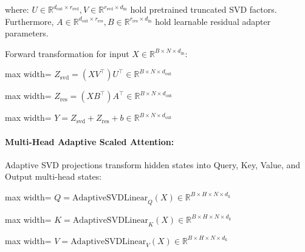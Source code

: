 where:
$U \in \mathbb{R}^{d_{\text{out}} \times r_{\text{svd}}}, V \in \mathbb{R}^{r_{\text{svd}} \times d_{\text{in}}}$ hold pretrained truncated SVD factors. Furthermore, $A \in \mathbb{R}^{d_{\text{out}} \times r_{\text{res}}}, B \in \mathbb{R}^{r_{\text{res}} \times d_{\text{in}}}$ hold learnable residual adapter parameters.


Forward transformation for input $X \in \mathbb{R}^{B \times N \times d_{\text{in}}}$:

\begin{center}
\begin{adjustbox}{max width=\columnwidth}
$\displaystyle
Z_{\text{svd}} = (X V^\top) U^\top \in \mathbb{R}^{B \times N \times d_{\text{out}}}
$
\end{adjustbox}
\end{center}
\begin{center}
\begin{adjustbox}{max width=\columnwidth}
$\displaystyle
Z_{\text{res}} = (X B^\top) A^\top \in \mathbb{R}^{B \times N \times d_{\text{out}}}
$
\end{adjustbox}
\end{center}
\begin{center}
\begin{adjustbox}{max width=\columnwidth}
$\displaystyle
Y = Z_{\text{svd}} + Z_{\text{res}} + b \in \mathbb{R}^{B \times N \times d_{\text{out}}}
$
\end{adjustbox}
\end{center}

\paragraph{Multi-Head Adaptive Scaled Attention:}
Adaptive SVD projections transform hidden states into Query, Key, Value, and Output multi-head states:

\begin{center}
\begin{adjustbox}{max width=\columnwidth}
$\displaystyle
Q = \text{AdaptiveSVDLinear}_Q(X) \in \mathbb{R}^{B \times H \times N \times d_k}
$
\end{adjustbox}
\end{center}
\begin{center}
\begin{adjustbox}{max width=\columnwidth}
$\displaystyle
K = \text{AdaptiveSVDLinear}_K(X) \in \mathbb{R}^{B \times H \times N \times d_k}
$
\end{adjustbox}
\end{center}
\begin{center}
\begin{adjustbox}{max width=\columnwidth}
$\displaystyle
V = \text{AdaptiveSVDLinear}_V(X) \in \mathbb{R}^{B \times H \times N \times d_k}
$
\end{adjustbox}
\end{center}

